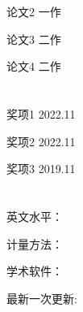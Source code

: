 \documentclass[UTF8,11pt]{ctexart}
\begin{document}
论文2 \hfill 一作 

论文3 \hfill 二作 

论文4 \hfill 二作 

\section{\underline{}}

\hspace{2em}奖项1  \hfill 2022.11  

奖项2   \hfill 2022.11  

奖项3  \hfill 2019.11 

\section{\underline{}}

\hspace{2em}英文水平：

计量方法：

学术软件：


\vfill \hfill 最新一次更新: \date{\today}
\end{document}

